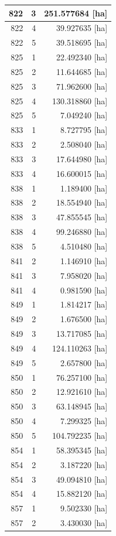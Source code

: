 \documentclass[11pt,]{book}
\begin{document}
\begin{table}
\begin{tabular}[t]{r|r|r}
\hline
822 & 3 & 251.577684 [ha]\\
\hline
822 & 4 & 39.927635 [ha]\\
\hline
822 & 5 & 39.518695 [ha]\\
\hline
825 & 1 & 22.492340 [ha]\\
\hline
825 & 2 & 11.644685 [ha]\\
\hline
825 & 3 & 71.962600 [ha]\\
\hline
825 & 4 & 130.318860 [ha]\\
\hline
825 & 5 & 7.049240 [ha]\\
\hline
833 & 1 & 8.727795 [ha]\\
\hline
833 & 2 & 2.508040 [ha]\\
\hline
833 & 3 & 17.644980 [ha]\\
\hline
833 & 4 & 16.600015 [ha]\\
\hline
838 & 1 & 1.189400 [ha]\\
\hline
838 & 2 & 18.554940 [ha]\\
\hline
838 & 3 & 47.855545 [ha]\\
\hline
838 & 4 & 99.246880 [ha]\\
\hline
838 & 5 & 4.510480 [ha]\\
\hline
841 & 2 & 1.146910 [ha]\\
\hline
841 & 3 & 7.958020 [ha]\\
\hline
841 & 4 & 0.981590 [ha]\\
\hline
849 & 1 & 1.814217 [ha]\\
\hline
849 & 2 & 1.676500 [ha]\\
\hline
849 & 3 & 13.717085 [ha]\\
\hline
849 & 4 & 124.110263 [ha]\\
\hline
849 & 5 & 2.657800 [ha]\\
\hline
850 & 1 & 76.257100 [ha]\\
\hline
850 & 2 & 12.921610 [ha]\\
\hline
850 & 3 & 63.148945 [ha]\\
\hline
850 & 4 & 7.299325 [ha]\\
\hline
850 & 5 & 104.792235 [ha]\\
\hline
854 & 1 & 58.395345 [ha]\\
\hline
854 & 2 & 3.187220 [ha]\\
\hline
854 & 3 & 49.094810 [ha]\\
\hline
854 & 4 & 15.882120 [ha]\\
\hline
857 & 1 & 9.502330 [ha]\\
\hline
857 & 2 & 3.430030 [ha]\\

\end{tabular}
\end{table}
\end{document}

